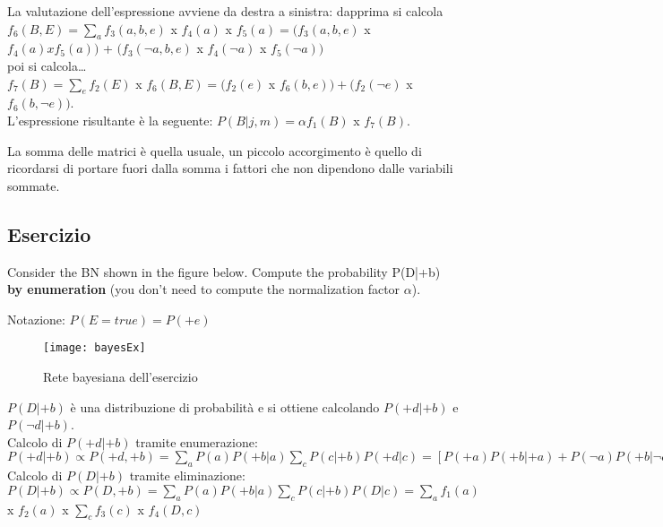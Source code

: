 La valutazione dell'espressione avviene da destra a sinistra: dapprima 
si calcola $f_6(B,E) = \sum_a f_3(a,b,e)$ x $f_4(a)$ x $f_5(a) = (f_3(a,b,e)$ x
$f_4(a) x f_5(a))$ + $(f_3(\neg a,b,e)$ x $f_4(\neg a)$ x $f_5(\neg a))$\\

poi si calcola\dots\\

$f_7(B) = \sum_e f_2(E)$ x $f_6(B,E) = (f_2(e)$ x $f_6(b,e)) + (f_2(\neg e)$ x
$f_6(b, \neg e))$.\\

L'espressione risultante è la seguente: $P(B|j,m) = \alpha f_1(B)$ x $f_7(B)$.

La somma delle matrici è quella usuale, un piccolo accorgimento è quello di
ricordarsi di portare fuori dalla somma i fattori che non dipendono dalle
variabili sommate.

\subsection{Esercizio}

Consider the BN shown in the figure below. Compute the probability
P(D|+b) \textbf{by enumeration} (you don't need to compute the normalization
factor $\alpha$).

Notazione: $P(E = true) = P(+e)$

\begin{figure}[H]
\centering
\texttt{[image: bayesEx]}
\caption{Rete bayesiana dell'esercizio}
\label{fig:bayesEx}
\end{figure}

$P(D|+b)$ è una distribuzione di probabilità e si ottiene calcolando $P(+d|+b)$ e
$P(\neg d|+b)$.\\

Calcolo di $P(+d|+b)$ tramite enumerazione:\\

$P(+d|+b) \propto P(+d, +b) = \sum_a P(a) P(+b|a) \sum_c P(c|+b) P(+d|c) =
[P(+a)P(+b|+a) + P(\neg a) P(+b|\neg a)][P(+c|+b) P(+d|+c) + P(\neg c|+b)
P(+d|\neg c)] = (0.9\cdot 0.7 + 0.1\cdot 0.2)\cdot (0.2\cdot 0.6 + 0.8\cdot 0.9) =
0.546$\\

Calcolo di $P(D|+b)$ tramite eliminazione:\\

$P(D|+b) \propto P(D, +b) = \sum_a P(a) P(+b|a) \sum_c P(c|+b) P(D|c) =
\sum_a f_1 (a)$ x $f_2 (a)$ x $\sum_c f_3 (c)$ x $f_4 (D, c)$\\

